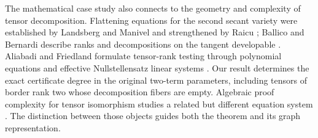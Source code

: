 The mathematical case study also connects to the geometry and complexity of tensor decomposition. Flattening equations for the second secant variety were established by Landsberg and Manivel and strengthened by Raicu \cite{landsbergmanivel,raicu}; Ballico and Bernardi describe ranks and decompositions on the tangent developable \cite{ballicobernardi}. Aliabadi and Friedland formulate tensor-rank testing through polynomial equations and effective Nullstellensatz linear systems \cite{aliabadifriedland}. Our result determines the exact certificate degree in the original two-term parameters, including tensors of border rank two whose decomposition fibers are empty. Algebraic proof complexity for tensor isomorphism studies a related but different equation system \cite{galesi}. The distinction between those objects guides both the theorem and its graph representation.
